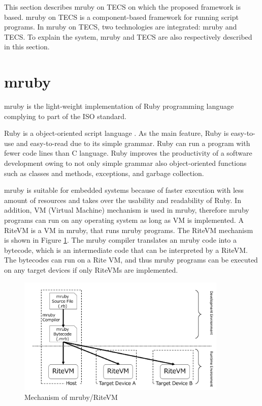 \documentclass[a4j,12pt,oneside,openany,english]{jsbook}
\begin{document}
This section describes mruby on TECS on which the proposed framework is based.
mruby on TECS is a component-based framework for running script programs.
In mruby on TECS, two technologies are integrated: mruby and TECS.
To explain the system, mruby and TECS are also respectively described in this section.

\section{mruby}
\label{sec:mruby}
mruby is the light-weight implementation of Ruby programming language complying to part of the ISO standard.

Ruby is a object-oriented script language \cite{url:Ruby}.
As the main feature, Ruby is easy-to-use and easy-to-read due to its simple grammar.
Ruby can run a program with fewer code lines than C language.
Ruby improves the productivity of a software development owing to not only simple grammar also object-oriented functions such as classes and methods, exceptions, and garbage collection.

mruby is suitable for embedded systems because of faster execution with less amount of resources and takes over the usability and readability of Ruby.
In addition, VM (Virtual Machine) mechanism is used in mruby, therefore mruby programs can run on any operating system as long as VM is implemented.
A RiteVM is a VM in mruby, that runs mruby programs.
The RiteVM mechanism is shown in Figure \ref{fig:mruby}.
The mruby compiler translates an mruby code into a bytecode, which is an intermediate code that can be interpreted by a RiteVM.
The bytecodes can run on a Rite VM, and thus mruby programs can be executed on any target devices if only RiteVMs are implemented.
\begin{figure}[t]
    \centering
    \includegraphics[width=10cm,clip]{../EMSOFT2016/figure/mruby.pdf}
    \caption{Mechanism of mruby/RiteVM}
    \label{fig:mruby}
\end{figure}
\end{document}
